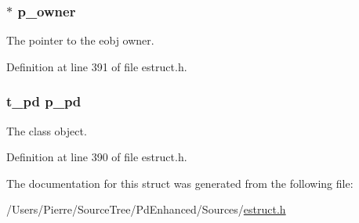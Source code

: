 \hypertarget{struct__eproxy_aafbddf848d70a14ab336be2b19cc535f}{
\subsubsection[{p\-\_\-owner}]{$\ast$ p\-\_\-owner}}\label{struct__eproxy_aafbddf848d70a14ab336be2b19cc535f}
The pointer to the eobj owner. 

Definition at line 391 of file estruct.\-h.

\hypertarget{struct__eproxy_a818a512bafab5b368d1fa0bca9872451}{
\subsubsection[{p\-\_\-pd}]{\setlength{\rightskip}{0pt plus 5cm}t\-\_\-pd p\-\_\-pd}}\label{struct__eproxy_a818a512bafab5b368d1fa0bca9872451}
The class object. 

Definition at line 390 of file estruct.\-h.



The documentation for this struct was generated from the following file\-:\begin{DoxyCompactItemize}
\item 
/\-Users/\-Pierre/\-Source\-Tree/\-Pd\-Enhanced/\-Sources/\hyperlink{estruct_8h}{estruct.\-h}\end{DoxyCompactItemize}
